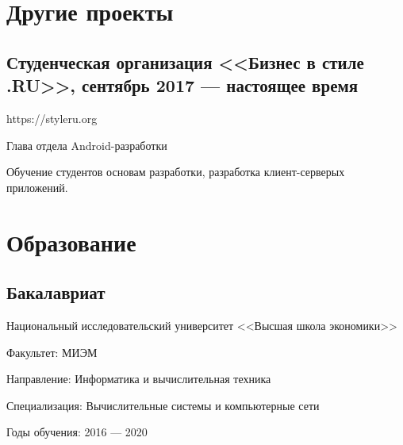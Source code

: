 \documentclass[a4paper,12pt]{article}
\begin{document}
    \section*{Другие проекты}

    \subsection*{Студенческая организация <<Бизнес в стиле .RU>>, сентябрь 2017 --- настоящее время}

    https://styleru.org\par
    Глава отдела Android-разработки\par
    Обучение студентов основам разработки, разработка клиент-серверых приложений.  

    \section*{Образование}

    \subsection*{Бакалавриат}

    Национальный исследовательский университет <<Высшая школа экономики>>\par
    Факультет: МИЭМ\par
    Направление: Информатика и вычислительная техника\par
    Специализация: Вычислительные системы и компьютерные сети\par
    Годы обучения: 2016 --- 2020
\end{document}
